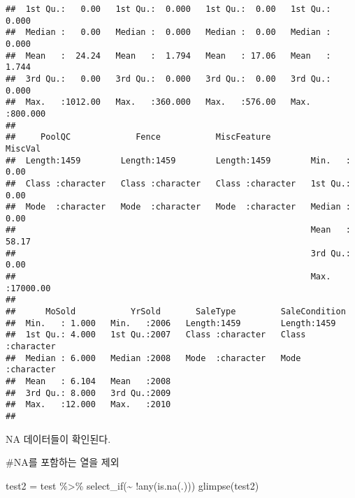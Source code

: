 \documentclass[
]{article}
\newenvironment{Shaded}{\begin{snugshade}}{\end{snugshade}}
\newcommand{\FunctionTok}[1]{\textcolor[rgb]{0.00,0.00,0.00}{#1}}
\newcommand{\NormalTok}[1]{#1}
\newcommand{\OtherTok}[1]{\textcolor[rgb]{0.56,0.35,0.01}{#1}}
\newcommand{\SpecialCharTok}[1]{\textcolor[rgb]{0.00,0.00,0.00}{#1}}
\begin{document}
\begin{verbatim}
##  1st Qu.:   0.00   1st Qu.:  0.000   1st Qu.:  0.00   1st Qu.:  0.000  
##  Median :   0.00   Median :  0.000   Median :  0.00   Median :  0.000  
##  Mean   :  24.24   Mean   :  1.794   Mean   : 17.06   Mean   :  1.744  
##  3rd Qu.:   0.00   3rd Qu.:  0.000   3rd Qu.:  0.00   3rd Qu.:  0.000  
##  Max.   :1012.00   Max.   :360.000   Max.   :576.00   Max.   :800.000  
##                                                                        
##     PoolQC             Fence           MiscFeature           MiscVal        
##  Length:1459        Length:1459        Length:1459        Min.   :    0.00  
##  Class :character   Class :character   Class :character   1st Qu.:    0.00  
##  Mode  :character   Mode  :character   Mode  :character   Median :    0.00  
##                                                           Mean   :   58.17  
##                                                           3rd Qu.:    0.00  
##                                                           Max.   :17000.00  
##                                                                             
##      MoSold           YrSold       SaleType         SaleCondition     
##  Min.   : 1.000   Min.   :2006   Length:1459        Length:1459       
##  1st Qu.: 4.000   1st Qu.:2007   Class :character   Class :character  
##  Median : 6.000   Median :2008   Mode  :character   Mode  :character  
##  Mean   : 6.104   Mean   :2008                                        
##  3rd Qu.: 8.000   3rd Qu.:2009                                        
##  Max.   :12.000   Max.   :2010                                        
## 
\end{verbatim}

NA 데이터들이 확인된다.

\#NA를 포함하는 열을 제외

\begin{Shaded}
\begin{Highlighting}[]
\NormalTok{test2 }\OtherTok{=}\NormalTok{ test }\SpecialCharTok{\%\textgreater{}\%}
  \FunctionTok{select\_if}\NormalTok{(}\SpecialCharTok{\textasciitilde{}} \SpecialCharTok{!}\FunctionTok{any}\NormalTok{(}\FunctionTok{is.na}\NormalTok{(.)))}
  \FunctionTok{glimpse}\NormalTok{(test2)}
\end{Highlighting}
\end{Shaded}
\end{document}

